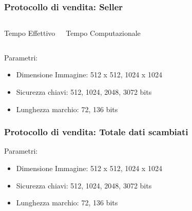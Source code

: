 \begin{frame}
\frametitle{Protocollo di vendita: Seller}
\begin{columns}[c]
   \begin{center}\end{center}
   \begin{center}\end{center}
 \end{columns}
 \begin{columns}[c]
   \begin{center}Tempo Effettivo\end{center}
   \begin{center}Tempo Computazionale\end{center}
 \end{columns}  
\begin{block}{Parametri:}
\begin{itemize}
\item Dimensione Immagine: 512 x 512, 1024 x 1024
\item Sicurezza chiavi: 512, 1024, 2048, 3072 bits
\item Lunghezza marchio: 72, 136 bits
\end{itemize}
\end{block}
\end{frame}

\begin{frame}
\frametitle{Protocollo di vendita: Totale dati scambiati}
   \begin{center}\end{center}
\begin{block}{Parametri:}
\begin{itemize}
\item Dimensione Immagine: 512 x 512, 1024 x 1024
\item Sicurezza chiavi: 512, 1024, 2048, 3072 bits
\item Lunghezza marchio: 72, 136 bits
\end{itemize}
\end{block}
\end{frame}

